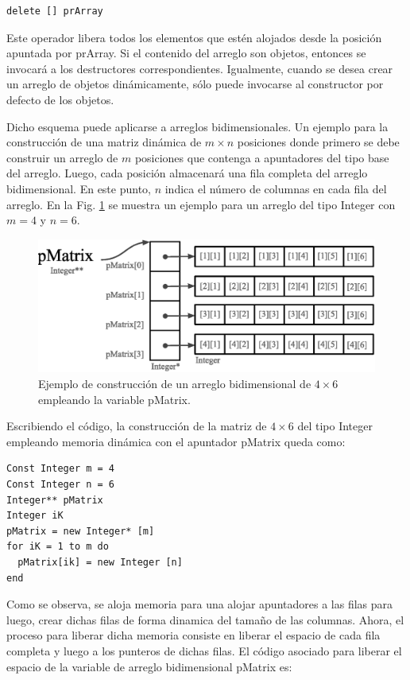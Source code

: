 \begin{lstlisting}[upquote=true, language=pseudo]
delete [] prArray
\end{lstlisting}

Este operador libera todos los elementos que estén alojados desde la posición apuntada por prArray. Si el contenido del arreglo son objetos, entonces se invocará a los destructores correspondientes. Igualmente, cuando se desea crear un arreglo de objetos dinámicamente, sólo puede invocarse al constructor por defecto de los objetos.

Dicho esquema puede aplicarse a arreglos bidimensionales. Un ejemplo para la construcción de una matriz dinámica de $m \times n$ posiciones donde primero se debe construir un arreglo de $m$ posiciones que contenga a apuntadores del tipo base del arreglo. Luego, cada posición almacenará una fila completa del arreglo bidimensional. En este punto, $n$ indica el número de columnas en cada fila del arreglo. En la Fig. \ref{fig:pointer1} se muestra un ejemplo para un arreglo del tipo Integer con $m=4$ y $n=6$.

\begin{figure}[!htb]
\centering
\includegraphics[scale=.65]{images/pointer1.eps}
\caption{Ejemplo de construcción de un arreglo bidimensional de $4 \times 6$ empleando la variable pMatrix.}
\label{fig:pointer1}
\end{figure}

Escribiendo el código, la construcción de la matriz de $4 \times 6$ del tipo Integer empleando memoria dinámica con el apuntador pMatrix queda como:

\begin{lstlisting}[upquote=true, language=pseudo]
Const Integer m = 4
Const Integer n = 6
Integer** pMatrix
Integer iK
pMatrix = new Integer* [m]
for iK = 1 to m do
  pMatrix[ik] = new Integer [n]
end
\end{lstlisting}

Como se observa, se aloja memoria para una alojar apuntadores a las filas para luego,  crear dichas filas de forma dinamica del tamaño de las columnas. Ahora, el proceso para liberar dicha memoria consiste en liberar el espacio de cada fila completa y luego a los punteros de dichas filas. El código asociado para liberar el espacio de la variable de arreglo bidimensional pMatrix es:


